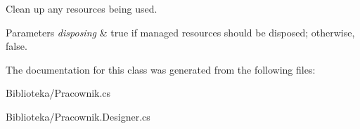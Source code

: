 Clean up any resources being used. 


\begin{DoxyParams}{Parameters}
{\em disposing} & true if managed resources should be disposed; otherwise, false.\\
\hline
\end{DoxyParams}


The documentation for this class was generated from the following files\+:\begin{DoxyCompactItemize}
\item 
Biblioteka/Pracownik.\+cs\item 
Biblioteka/Pracownik.\+Designer.\+cs\end{DoxyCompactItemize}
